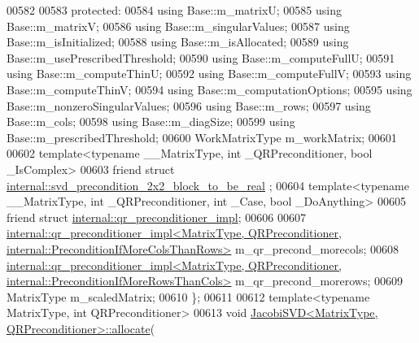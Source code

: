 \begin{DoxyCode}
00582 
00583   \textcolor{keyword}{protected}:
00584     \textcolor{keyword}{using} Base::m\_matrixU;
00585     \textcolor{keyword}{using} Base::m\_matrixV;
00586     \textcolor{keyword}{using} Base::m\_singularValues;
00587     \textcolor{keyword}{using} Base::m\_isInitialized;
00588     \textcolor{keyword}{using} Base::m\_isAllocated;
00589     \textcolor{keyword}{using} Base::m\_usePrescribedThreshold;
00590     \textcolor{keyword}{using} Base::m\_computeFullU;
00591     \textcolor{keyword}{using} Base::m\_computeThinU;
00592     \textcolor{keyword}{using} Base::m\_computeFullV;
00593     \textcolor{keyword}{using} Base::m\_computeThinV;
00594     \textcolor{keyword}{using} Base::m\_computationOptions;
00595     \textcolor{keyword}{using} Base::m\_nonzeroSingularValues;
00596     \textcolor{keyword}{using} Base::m\_rows;
00597     \textcolor{keyword}{using} Base::m\_cols;
00598     \textcolor{keyword}{using} Base::m\_diagSize;
00599     \textcolor{keyword}{using} Base::m\_prescribedThreshold;
00600     WorkMatrixType m\_workMatrix;
00601 
00602     \textcolor{keyword}{template}<\textcolor{keyword}{typename} \_\_MatrixType, \textcolor{keywordtype}{int} \_QRPreconditioner, \textcolor{keywordtype}{bool} \_IsComplex>
00603     \textcolor{keyword}{friend} \textcolor{keyword}{struct }\hyperlink{struct_eigen_1_1internal_1_1svd__precondition__2x2__block__to__be__real}{internal::svd\_precondition\_2x2\_block\_to\_be\_real}
      ;
00604     \textcolor{keyword}{template}<\textcolor{keyword}{typename} \_\_MatrixType, \textcolor{keywordtype}{int} \_QRPreconditioner, \textcolor{keywordtype}{int} \_Case, \textcolor{keywordtype}{bool} \_DoAnything>
00605     \textcolor{keyword}{friend} \textcolor{keyword}{struct }\hyperlink{struct_eigen_1_1internal_1_1qr__preconditioner__impl}{internal::qr\_preconditioner\_impl};
00606 
00607     
      \hyperlink{struct_eigen_1_1internal_1_1qr__preconditioner__impl}{internal::qr\_preconditioner\_impl<MatrixType, QRPreconditioner, internal::PreconditionIfMoreColsThanRows>}
       m\_qr\_precond\_morecols;
00608     
      \hyperlink{struct_eigen_1_1internal_1_1qr__preconditioner__impl}{internal::qr\_preconditioner\_impl<MatrixType, QRPreconditioner, internal::PreconditionIfMoreRowsThanCols>}
       m\_qr\_precond\_morerows;
00609     MatrixType m\_scaledMatrix;
00610 \};
00611 
00612 \textcolor{keyword}{template}<\textcolor{keyword}{typename} MatrixType, \textcolor{keywordtype}{int} QRPreconditioner>
00613 \textcolor{keywordtype}{void} \hyperlink{group___s_v_d___module_class_eigen_1_1_jacobi_s_v_d}{JacobiSVD<MatrixType, QRPreconditioner>::allocate}(

\end{DoxyCode}
